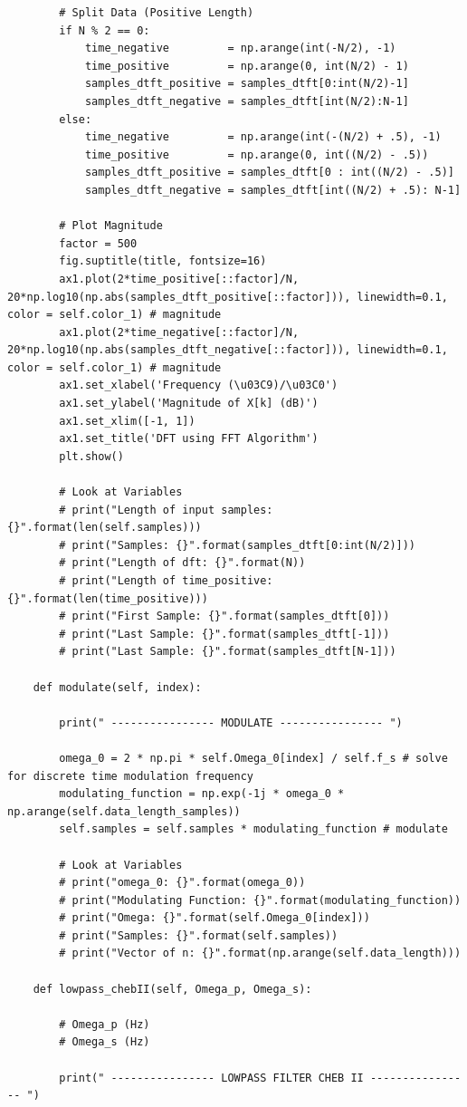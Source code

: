 \documentclass{article}
\begin{document}
\begin{lstlisting}
		# Split Data (Positive Length)
		if N % 2 == 0:
			time_negative         = np.arange(int(-N/2), -1)
			time_positive         = np.arange(0, int(N/2) - 1)
			samples_dtft_positive = samples_dtft[0:int(N/2)-1]
			samples_dtft_negative = samples_dtft[int(N/2):N-1]
		else:
			time_negative         = np.arange(int(-(N/2) + .5), -1)
			time_positive         = np.arange(0, int((N/2) - .5))
			samples_dtft_positive = samples_dtft[0 : int((N/2) - .5)]
			samples_dtft_negative = samples_dtft[int((N/2) + .5): N-1]

		# Plot Magnitude
		factor = 500
		fig.suptitle(title, fontsize=16)
		ax1.plot(2*time_positive[::factor]/N, 20*np.log10(np.abs(samples_dtft_positive[::factor])), linewidth=0.1,  color = self.color_1) # magnitude
		ax1.plot(2*time_negative[::factor]/N, 20*np.log10(np.abs(samples_dtft_negative[::factor])), linewidth=0.1,  color = self.color_1) # magnitude
		ax1.set_xlabel('Frequency (\u03C9)/\u03C0')
		ax1.set_ylabel('Magnitude of X[k] (dB)')
		ax1.set_xlim([-1, 1])
		ax1.set_title('DFT using FFT Algorithm')
		plt.show()

		# Look at Variables
		# print("Length of input samples: {}".format(len(self.samples)))
		# print("Samples: {}".format(samples_dtft[0:int(N/2)]))
		# print("Length of dft: {}".format(N))
		# print("Length of time_positive: {}".format(len(time_positive)))
		# print("First Sample: {}".format(samples_dtft[0]))
		# print("Last Sample: {}".format(samples_dtft[-1]))
		# print("Last Sample: {}".format(samples_dtft[N-1]))

	def modulate(self, index):

		print(" ---------------- MODULATE ---------------- ")

		omega_0 = 2 * np.pi * self.Omega_0[index] / self.f_s # solve for discrete time modulation frequency
		modulating_function = np.exp(-1j * omega_0 * np.arange(self.data_length_samples))
		self.samples = self.samples * modulating_function # modulate

		# Look at Variables
		# print("omega_0: {}".format(omega_0))
		# print("Modulating Function: {}".format(modulating_function))
		# print("Omega: {}".format(self.Omega_0[index]))
		# print("Samples: {}".format(self.samples))
		# print("Vector of n: {}".format(np.arange(self.data_length)))

	def lowpass_chebII(self, Omega_p, Omega_s):

		# Omega_p (Hz) 
		# Omega_s (Hz)

		print(" ---------------- LOWPASS FILTER CHEB II ---------------- ")


\end{lstlisting}
\end{document}
